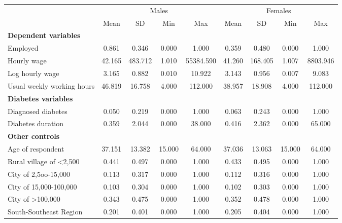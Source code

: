 \begin{table}[h]
\begin{center}
\begin{adjustbox}{max width=\textwidth}
{ \def\sym#1{\ifmmode^{#1}\else\(^{#1}\)\fi} \begin{tabular}{l*{2}{cccc}}
\toprule
                    &\multicolumn{4}{c}{Males}                          &\multicolumn{4}{c}{Females}                        \\
                    &        Mean&          SD&         Min&         Max&        Mean&          SD&         Min&         Max\\
\midrule
\textbf{Dependent variables} &&&&&&&& \\
Employed            &       0.861&       0.346&       0.000&       1.000&       0.359&       0.480&       0.000&       1.000\\
Hourly wage             &      42.165&     483.712&       1.010&   55384.590&      41.260&     168.405&       1.007&    8803.946\\
Log hourly wage     &       3.165&       0.882&       0.010&      10.922&       3.143&       0.956&       0.007&       9.083\\
Usual weekly working hours&      46.819&      16.758&       4.000&     112.000&      38.957&      18.908&       4.000&     112.000\\
\textbf{Diabetes variables} &&&&&&&& \\
Diagnosed diabetes  &       0.050&       0.219&       0.000&       1.000&       0.063&       0.243&       0.000&       1.000\\
Diabetes duration   &       0.359&       2.044&       0.000&      38.000&       0.416&       2.362&       0.000&      65.000\\
\textbf{Other controls} &&&&&&&& \\
Age of respondent   &      37.151&      13.382&      15.000&      64.000&      37.036&      13.063&      15.000&      64.000\\
Rural village of <2,500&       0.441&       0.497&       0.000&       1.000&       0.433&       0.495&       0.000&       1.000\\
City of 2,5oo-15,000&       0.113&       0.317&       0.000&       1.000&       0.112&       0.316&       0.000&       1.000\\
City of 15,000-100,000&       0.103&       0.304&       0.000&       1.000&       0.102&       0.303&       0.000&       1.000\\
City of >100,000    &       0.343&       0.475&       0.000&       1.000&       0.352&       0.478&       0.000&       1.000\\
South-Southeast Region&       0.201&       0.401&       0.000&       1.000&       0.205&       0.404&       0.000&       1.000\\

\end{tabular}}
\end{adjustbox}
\end{center}
\end{table}
